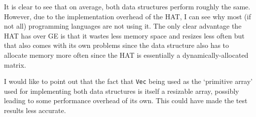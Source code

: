 It is clear to see that on average, both data structures perform roughly the same. However, due to the implementation overhead of the HAT, I can see why most (if not all) programming languages are not using it. The only clear advantage the HAT has over GE is that it wastes less memory space and resizes less often but that also comes with its own problems since the data structure also has to allocate memory more often since the HAT is essentially a dynamically-allocated matrix.

I would like to point out that the fact that \texttt{Vec} being used as the `primitive array' used for implementing both data structures is itself a resizable array, possibly leading to some performance overhead of its own. This could have made the test results less accurate.

\endgroup
